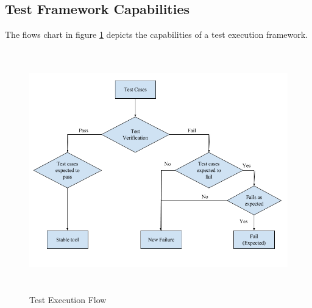 \documentclass[10pt]{ruthesis}
\begin{document}
\subsection{Test Framework Capabilities}
The flows chart in figure \ref{fig:flowchart} depicts the capabilities of a test execution framework.
\begin{figure}
  \centering
  \includegraphics[width=15cm,height=10.5cm]{flowchart.png}
  \caption{Test Execution Flow}
  \label{fig:flowchart}
\end{figure}
\end{document}

